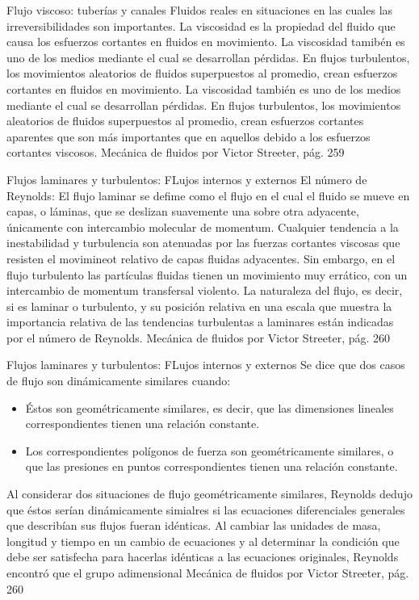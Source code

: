 
\begin{frame}{Flujo viscoso: tuberías y canales}
\justifying
Fluidos reales en situaciones en las cuales las irreversibilidades son importantes. La viscosidad es la propiedad del fluido que causa los esfuerzos cortantes en fluidos en movimiento. La viscosidad tamibén es uno de los medios mediante el cual se desarrollan pérdidas. En flujos turbulentos, los movimientos aleatorios de fluidos superpuestos al promedio, crean esfuerzos cortantes en fluidos en movimiento. La viscosidad también es uno de los medios mediante el cual se desarrollan pérdidas. En flujos turbulentos, los movimientos aleatorios de fluidos superpuestos al promedio, crean esfuerzos cortantes aparentes que son más importantes que en aquellos debido a los esfuerzos cortantes viscosos.
{\tiny Mecánica de fluidos por Victor Streeter, pág. 259}
\end{frame}

\begin{frame}{Flujos laminares y turbulentos: FLujos internos y externos}
\justifying
El número de Reynolds:
El flujo laminar se defime como el flujo en el cual el fluido se mueve en capas, o láminas, que se deslizan suavemente una sobre otra adyacente, únicamente con intercambio molecular de momentum. Cualquier tendencia a la inestabilidad y turbulencia son atenuadas por las fuerzas cortantes viscosas que resisten el movimineot relativo de capas fluidas adyacentes. Sin embargo, en el flujo turbulento las partículas fluidas tienen un movimiento muy errático, con un intercambio de momentum transfersal violento. La naturaleza del flujo, es decir, si es laminar o turbulento, y su posición relativa en una escala que muestra la importancia relativa de las tendencias turbulentas a laminares están indicadas por el número de Reynolds.
{\tiny Mecánica de fluidos por Victor Streeter, pág. 260}
\end{frame}

\begin{frame}{Flujos laminares y turbulentos: FLujos internos y externos}
\justifying
Se dice que dos casos de flujo son dinámicamente similares cuando:
\begin{itemize}
\item Éstos son geométricamente similares, es decir, que las dimensiones lineales correspondientes tienen una relación constante.
\item Los correspondientes polígonos de fuerza son geométricamente similares, o que las presiones en puntos correspondientes tienen una relación constante.
\end{itemize}
Al considerar dos situaciones de flujo geométricamente similares, Reynolds dedujo que éstos serían dinámicamente simialres si las ecuaciones diferenciales generales que describían sus flujos fueran idénticas. Al cambiar las unidades de masa, longitud y tiempo en un cambio de ecuaciones y al determinar la condición que debe ser satisfecha para hacerlas idénticas a las ecuaciones originales, Reynolds encontró que el grupo adimensional 
{\tiny Mecánica de fluidos por Victor Streeter, pág. 260}
\end{frame}

